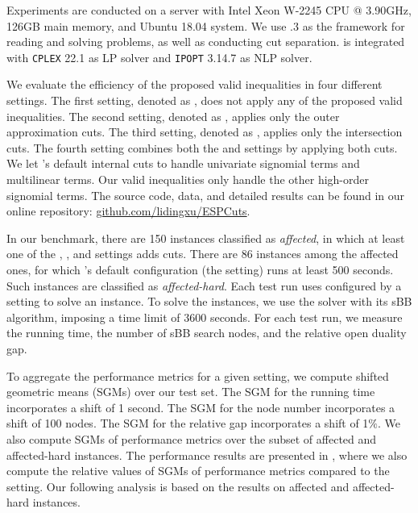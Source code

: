 Experiments are conducted on a server with  Intel Xeon W-2245 CPU @ 3.90GHz, 126GB main memory, and Ubuntu 18.04 system.  We use .3 \cite{bestuzheva2023global}  as the framework for reading and solving problems, as well as conducting cut separation. \scip is integrated with \texttt{CPLEX} 22.1 as LP solver and \texttt{IPOPT} 3.14.7 as  NLP solver.


We evaluate the efficiency of the proposed valid inequalities in four different settings. The first setting, denoted as \disable, does not apply any of the proposed valid inequalities. The second setting, denoted as \oc, applies only the outer approximation cuts. The third setting, denoted as \ic, applies only the intersection cuts. The fourth setting combines both the \oc and \ic settings by applying both cuts.  We let \scip's default internal cuts to handle univariate signomial terms and multilinear terms. Our valid inequalities only handle the other high-order signomial terms.  The source code, data, and detailed results can be found in our online repository: \href{https://github.com/lidingxu/ESPCuts}{github.com/lidingxu/ESPCuts}.


In our benchmark, there are 150 instances classified as \emph{affected}, in which at least one of the \oc, \ic, and \oic settings adds cuts. There are 86 instances among the affected ones, for which \scip's default configuration (\ie the \disable setting) runs at least 500 seconds. Such instances are classified as \emph{affected-hard}. Each test run uses \scip configured by a setting to solve an instance. To solve the instances, we use the \scip solver with its sBB algorithm, imposing a time limit of 3600 seconds. For each test run, we measure the running time, the number of sBB search nodes, and the relative open duality gap.


To aggregate the performance metrics for a given setting, we compute shifted geometric means (SGMs) over our test set. The SGM for the running time incorporates a shift of 1 second. The SGM for the node number incorporates a shift of 100 nodes. The SGM for the relative gap incorporates a shift of 1$\%$. We  also compute SGMs of   performance metrics over the subset of affected and affected-hard instances. The performance results are presented in  , where we also compute the relative values of SGMs of  performance metrics compared to the \disable setting. Our following analysis is based on the results on affected and affected-hard instances.





